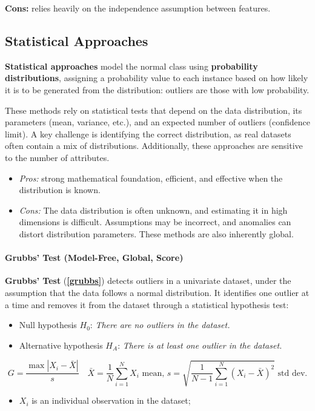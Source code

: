 \textbf{Cons:} relies heavily on the independence assumption between features.

\subsection{Statistical Approaches}
\textbf{Statistical approaches} model the normal class using \textbf{probability distributions}, assigning a probability value to each instance based on how likely it is to be generated from the distribution: outliers are those with low probability.

These methods rely on statistical tests that depend on the data distribution, its parameters (mean, variance, etc.), and an expected number of outliers (confidence limit). A key challenge is identifying the correct distribution, as real datasets often contain a mix of distributions. Additionally, these approaches are sensitive to the number of attributes.
\begin{itemize}
    \item \textit{Pros:} strong mathematical foundation, efficient, and effective when the distribution is known.
    \item \textit{Cons:} The data distribution is often unknown, and estimating it in high dimensions is difficult. Assumptions may be incorrect, and anomalies can distort distribution parameters. These methods are also inherently global.
\end{itemize}

\paragraph{Grubbs' Test (Model-Free, Global, Score)}
\textbf{Grubbs' Test} (\textbf{\ref{grubbs}}) detects outliers in a univariate dataset, under the assumption that the data follows a normal distribution. It identifies one outlier at a time and removes it from the dataset through a statistical hypothesis test:

\begin{itemize}
    \item Null hypothesis $H_0$: \textit{There are no outliers in the dataset.}
    \item Alternative hypothesis $H_A$: \textit{There is at least one outlier in the dataset.}
\end{itemize}

\begin{equation}\label{grubbs}
    G = \frac{\max |X_i - \bar{X}|}{s} \quad \bar{X} = \frac{1}{N} \sum_{i=1}^{N} X_i \text{ mean, }s = \sqrt{\frac{1}{N-1} \sum_{i=1}^{N} (X_i - \bar{X})^2} \text{ std dev.}
\end{equation}
\begin{itemize}
    \item $X_i$ is an individual observation in the dataset;
\end{itemize}


